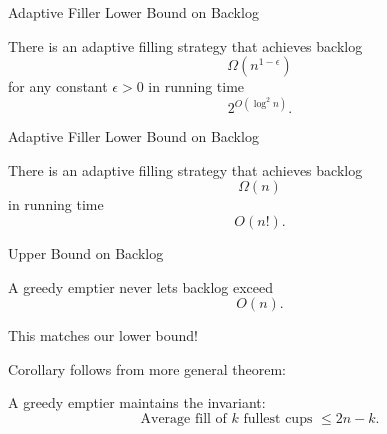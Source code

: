 \documentclass[xcolor=x11names, svgnames, rgb]{beamer}
\begin{document}
\begin{frame}[t]{Adaptive Filler Lower Bound on Backlog}
  \begin{theorem}
    There is an adaptive filling strategy that achieves
    backlog $$\Omega(n^{1-\epsilon})$$ for any
    constant $\epsilon >0$ in running time $$2^{O(\log^2 n)}.$$
  \end{theorem}
\end{frame}
\begin{frame}[t]{Adaptive Filler Lower Bound on Backlog}
  \begin{theorem}
    There is an adaptive filling strategy that
    achieves backlog $$\Omega(n)$$ in running time $$O(n!).$$
  \end{theorem}
\end{frame}
\begin{frame}[t]{Upper Bound on Backlog}
  \begin{corollary}
  A greedy emptier never lets backlog exceed $$O(n).$$
  \end{corollary}
  This matches our lower bound!
  \vspace{0.5cm}

  Corollary follows from more general theorem:
  \begin{theorem}
    A greedy emptier maintains the invariant: 
    $$\text{Average fill of $k$ fullest cups } \le 2n-k.$$
  \end{theorem}
\end{frame}
\end{document}
